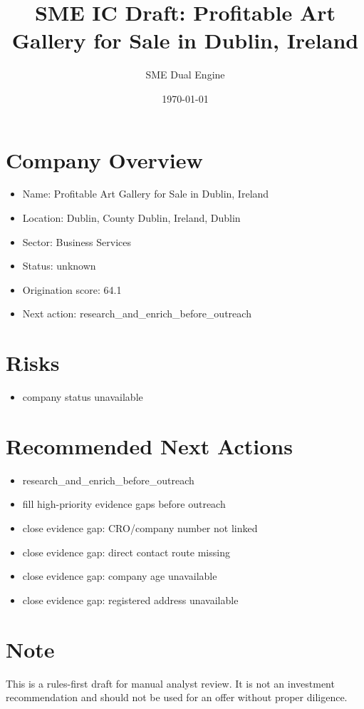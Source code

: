 \documentclass[11pt,a4paper]{article}
\title{SME IC Draft: Profitable Art Gallery for Sale in Dublin, Ireland}
\author{SME Dual Engine}
\date{\today}
\begin{document}
\maketitle
\section*{Company Overview}
\begin{itemize}[leftmargin=1.4em]
\item Name: Profitable Art Gallery for Sale in Dublin, Ireland
\item Location: Dublin, County Dublin, Ireland, Dublin
\item Sector: Business Services
\item Status: unknown
\item Origination score: 64.1
\item Next action: research\_and\_enrich\_before\_outreach
\end{itemize}
\section*{Risks}
\begin{itemize}[leftmargin=1.4em]
\item company status unavailable
\end{itemize}
\section*{Recommended Next Actions}
\begin{itemize}[leftmargin=1.4em]
\item research\_and\_enrich\_before\_outreach
\item fill high-priority evidence gaps before outreach
\item close evidence gap: CRO/company number not linked
\item close evidence gap: direct contact route missing
\item close evidence gap: company age unavailable
\item close evidence gap: registered address unavailable
\end{itemize}
\section*{Note}
This is a rules-first draft for manual analyst review. It is not an investment
recommendation and should not be used for an offer without proper diligence.
\end{document}
